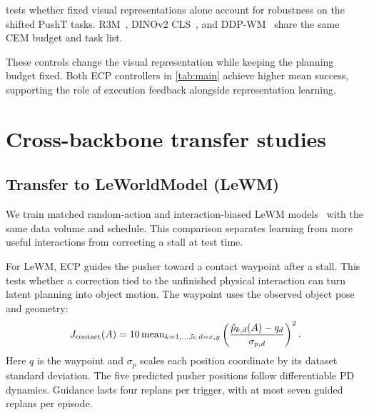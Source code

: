 \makeatletter
\setlength{\@fptop}{0pt}
\setlength{\@dblfptop}{0pt}
\makeatother
\clearpage
\begin{table}[!t]
\par\smallskip
\noindent \begin{minipage}[t]{\columnwidth}
\vspace{0pt}
 tests whether fixed visual representations alone account for robustness on the shifted PushT tasks. R3M~\cite{nair2022r3m}, DINOv2 CLS~\cite{oquab2024dinov2}, and DDP-WM~\cite{yin2026ddpwm} share the same CEM budget and task list.\par\smallskip
\normalsize
These controls change the visual representation while keeping the planning budget fixed. Both ECP controllers in \cref{tab:main} achieve higher mean success, supporting the role of execution feedback alongside representation learning.\par
\end{minipage}\hfill
\begin{minipage}[t]{\columnwidth}
\vspace{0pt}
\par\smallskip
{\centering
\centering

\par}
\end{minipage}\par
\par\smallskip
\noindent \begin{minipage}[t]{\columnwidth}
\vspace{0pt}
\section{Cross-backbone transfer studies}
\label{sec:backbone}
\subsection{Transfer to LeWorldModel (LeWM)}
We train matched random-action and interaction-biased LeWM models~\cite{maes2026lewm} with the same data volume and schedule. This comparison separates learning from more useful interactions from correcting a stall at test time.\par\smallskip
\normalsize
For LeWM, ECP guides the pusher toward a contact waypoint after a stall. This tests whether a correction tied to the unfinished physical interaction can turn latent planning into object motion. The waypoint uses the observed object pose and geometry:
\[
 J_{\rm contact}(A)=10\operatorname{mean}_{k=1,\ldots,5;\,d=x,y}
 \left(\frac{\hat p_{k,d}(A)-q_d}{\sigma_{p,d}}\right)^2.
\]
Here $q$ is the waypoint and $\sigma_p$ scales each position coordinate by its dataset standard deviation. The five predicted pusher positions follow differentiable PD dynamics. Guidance lasts four replans per trigger, with at most seven guided replans per episode.


\end{minipage}
\end{table}
